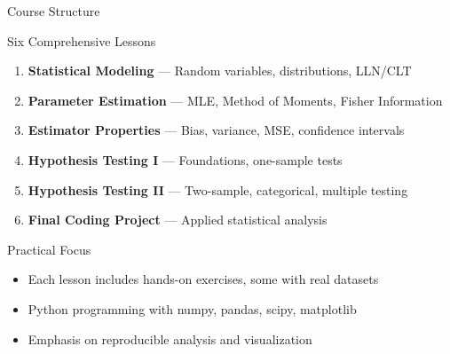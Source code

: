 
\begin{frame}{Course Structure}
  \begin{block}{Six Comprehensive Lessons}
    \begin{enumerate}
      \item \textbf{Statistical Modeling} — Random variables, distributions, LLN/CLT
      \item \textbf{Parameter Estimation} — MLE, Method of Moments, Fisher Information
      \item \textbf{Estimator Properties} — Bias, variance, MSE, confidence intervals
      \item \textbf{Hypothesis Testing I} — Foundations, one-sample tests
      \item \textbf{Hypothesis Testing II} — Two-sample, categorical, multiple testing
      \item \textbf{Final Coding Project} — Applied statistical analysis
    \end{enumerate}
  \end{block}

  \begin{block}{Practical Focus}
    \begin{itemize}
      \item Each lesson includes hands-on exercises, some with real datasets
      \item Python programming with numpy, pandas, scipy, matplotlib
      \item Emphasis on reproducible analysis and visualization
    \end{itemize}
  \end{block}
\end{frame}
